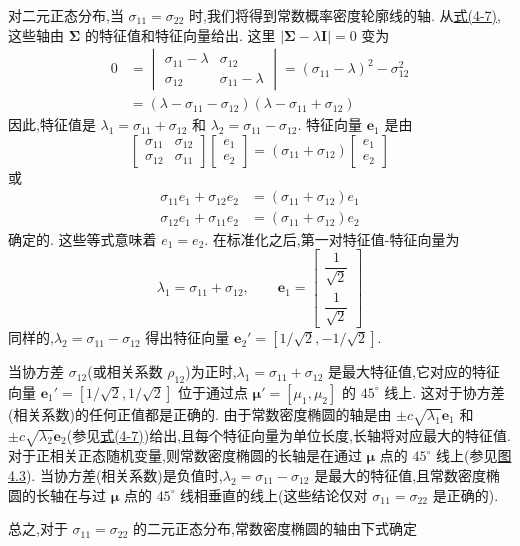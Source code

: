 对二元正态分布,当 $\sigma_{11}=\sigma_{22}$ 时,我们将得到常数概率密度轮廓线的轴. 从\hyperref[eq:4-7]{式(4-7)},这些轴由 $\boldsymbol{\Sigma}$ 的特征值和特征向量给出. 这里 $|\boldsymbol{\Sigma}-\lambda\mathbf{I}|=0$ 变为
\begin{align*}
0&=\begin{vmatrix}\sigma_{11}-\lambda&\sigma_{12}\\\sigma_{12}&\sigma_{11}-\lambda\end{vmatrix}=(\sigma_{11}-\lambda)^{2}-\sigma_{12}^{2}\\
&=(\lambda-\sigma_{11}-\sigma_{12})(\lambda-\sigma_{11}+\sigma_{12})
\end{align*}
因此,特征值是 $\lambda_1=\sigma_{11}+\sigma_{12}$ 和 $\lambda_2=\sigma_{11}-\sigma_{12}$. 特征向量 $\mathbf{e}_1$ 是由
\[
\begin{bmatrix}\sigma_{11}&\sigma_{12}\\\sigma_{12}&\sigma_{11}\end{bmatrix}\begin{bmatrix}e_1\\e_2\end{bmatrix}=(\sigma_{11}+\sigma_{12})\begin{bmatrix}e_1\\e_2\end{bmatrix}
\]
或
\begin{align*}
\sigma_{11}e_1+\sigma_{12}e_2&=(\sigma_{11}+\sigma_{12})e_1\\
\sigma_{12}e_1+\sigma_{11}e_2&=(\sigma_{11}+\sigma_{12})e_2
\end{align*}
确定的. 这些等式意味着 $e_1=e_2$. 在标准化之后,第一对特征值-特征向量为
\[
\lambda_1=\sigma_{11}+\sigma_{12},\qquad \mathbf{e}_1=\begin{bmatrix}\dfrac{1}{\sqrt{2}}\\[2ex]\dfrac{1}{\sqrt{2}}\end{bmatrix}
\]
同样的,$\lambda_2=\sigma_{11}-\sigma_{12}$ 得出特征向量 $\mathbf{e}_2'=[1/\sqrt{2},-1/\sqrt{2}]$.

当协方差 $\sigma_{12}$(或相关系数 $\rho_{12}$)为正时,$\lambda_1=\sigma_{11}+\sigma_{12}$ 是最大特征值,它对应的特征向量 $\mathbf{e}_1'=[1/\sqrt{2},1/\sqrt{2}]$ 位于通过点 $\boldsymbol{\mu}'=[\mu_1,\mu_2]$ 的 $45^\circ$ 线上. 这对于协方差(相关系数)的任何正值都是正确的. 由于常数密度椭圆的轴是由 $\pm c\sqrt{\lambda_1}\mathbf{e}_1$ 和 $\pm c\sqrt{\lambda_2}\mathbf{e}_2$(参见\hyperref[eq:4-7]{式(4-7)})给出,且每个特征向量为单位长度,长轴将对应最大的特征值. 对于正相关正态随机变量,则常数密度椭圆的长轴是在通过 $\boldsymbol{\mu}$ 点的 $45^\circ$ 线上(参见\hyperref[fig:4.3]{图 4.3}). 当协方差(相关系数)是负值时,$\lambda_2=\sigma_{11}-\sigma_{12}$ 是最大的特征值,且常数密度椭圆的长轴在与过 $\boldsymbol{\mu}$ 点的 $45^\circ$ 线相垂直的线上(这些结论仅对 $\sigma_{11}=\sigma_{22}$ 是正确的).

总之,对于 $\sigma_{11}=\sigma_{22}$ 的二元正态分布,常数密度椭圆的轴由下式确定
